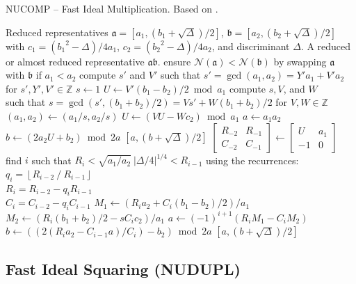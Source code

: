 \documentclass{ucalgthes1}
\theoremstyle{definition}
\newcommand{\ZZ}{\mathbb{Z}}
\newcommand{\matrixtt}[4]{\left[ \begin{array}{rr} #1 & #2 \\ #3 & #4 \end{array} \right]}
\newcommand{\floor}[1]{\left\lfloor #1 \right\rfloor}
\begin{document}
\begin{algorithm}[h]
\caption{NUCOMP -- Fast Ideal Multiplication. Based on \cite[pp.441-443]{Jacobson2009}.}
\label{alg:nucomp}
\begin{algorithmic}[1]
\REQUIRE Reduced representatives $\mathfrak a = [a_1, (b_1+\sqrt\Delta)/2]$, $\mathfrak b = [a_2, (b_2+\sqrt\Delta)/2]$ \\ with $c_1 = ({b_1}^2-\Delta)/4a_1$, $c_2 = ({b_2}^2-\Delta)/4a_2$, and discriminant $\Delta$.
\ENSURE A reduced or almost reduced representative $\mathfrak a \mathfrak b$.
\STATE ensure $\mathcal N(\mathfrak a) < \mathcal N(\mathfrak b)$ by swapping $\mathfrak a$ with $\mathfrak b$ if $a_1 < a_2$
\STATE compute $s'$ and $V'$ such that $s' = \gcd(a_1, a_2) = Y'a_1 + V'a_2$ for $s', Y', V' \in \ZZ$
\STATE $s \gets 1$
\STATE $U \gets V'(b_1 - b_2)/2 \bmod a_1$
	\STATE compute $s, V$, and $W$ \\
	       such that $s = \gcd(s', (b_1 + b_2)/2) = Vs' + W(b_1 + b_2)/2$ for $V, W \in \ZZ$
	\STATE $(a_1, a_2) \gets (a_1/s, a_2/s)$
	\STATE $U \gets (VU - Wc_2) \bmod a_1$
\ENDIF
{}
	\STATE $a \gets a_1a_2$
	\STATE $b \gets (2a_2U + b_2) \bmod{2a}$
	\RETURN $[a, (b+\sqrt\Delta)/2]$
\ENDIF
\STATE $\matrixtt{R_{-2}}{R_{-1}}{C_{-2}}{C_{-1}} \gets \matrixtt{U}{a_1}{-1}{0}$
\STATE find $i$ such that $R_i < \sqrt{a_1/a_2} ~ |\Delta/4|^{1/4} < R_{i-1}$ using the recurrences: \\
$q_i = \floor{R_{i-2} ~/~ R_{i-1}}$ \\
$R_i = R_{i-2}-q_i R_{i-1}$ \\
$C_i=C_{i-2}-q_i C_{i-1}$
\STATE $M_1 \gets (R_i a_2 + C_i(b_1-b_2)/2)/a_1$
\STATE $M_2 \gets (R_i (b_1+b_2)/2 -sC_i c_2)/a_1$
\STATE $a \gets (-1)^{i+1}(R_i M_1 - C_i M_2)$
\STATE $b \gets ((2(R_i a_2 - C_{i-1} a)/C_i) - b_2) \bmod{2a}$
\RETURN $[a, (b+\sqrt\Delta)/2]$
\end{algorithmic}
\end{algorithm}


\subsection{Fast Ideal Squaring (NUDUPL)}
\label{subsec:nudupl}
\end{document}
